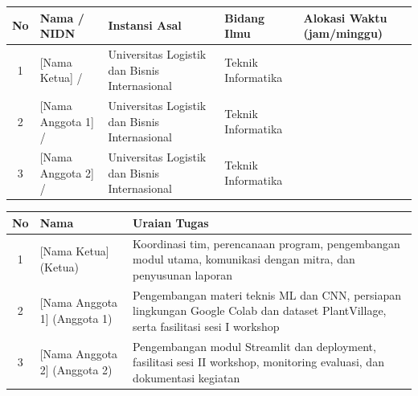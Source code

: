 
\begin{table}[h]
    \centering
    \begin{tabularx}{\textwidth}{|c|X|X|X|X|}
        \hline
        \textbf{No} & \textbf{Nama / NIDN} & \textbf{Instansi Asal} & \textbf{Bidang Ilmu} & \textbf{Alokasi Waktu (jam/minggu)} \\ \hline
        1 & {[Nama Ketua]} / & Universitas Logistik dan Bisnis Internasional & Teknik Informatika & \\ \hline
        2 & {[Nama Anggota 1]} / & Universitas Logistik dan Bisnis Internasional & Teknik Informatika & \\ \hline
        3 & {[Nama Anggota 2]} / & Universitas Logistik dan Bisnis Internasional & Teknik Informatika & \\ \hline
    \end{tabularx}
\end{table}

\vspace{0.5cm}

\begin{table}[h]
    \centering
    \begin{tabularx}{\textwidth}{|c|X|X|}
        \hline
        \textbf{No} & \textbf{Nama} & \textbf{Uraian Tugas} \\ \hline
        1 & {[Nama Ketua]} (Ketua) & Koordinasi tim, perencanaan program, pengembangan modul utama, komunikasi dengan mitra, dan penyusunan laporan \\ \hline
        2 & {[Nama Anggota 1]} (Anggota 1) & Pengembangan materi teknis ML dan CNN, persiapan lingkungan Google Colab dan dataset PlantVillage, serta fasilitasi sesi I workshop \\ \hline
        3 & {[Nama Anggota 2]} (Anggota 2) & Pengembangan modul Streamlit dan deployment, fasilitasi sesi II workshop, monitoring evaluasi, dan dokumentasi kegiatan \\ \hline
    \end{tabularx}
\end{table}
